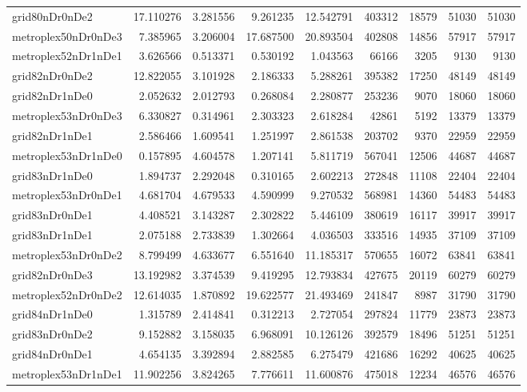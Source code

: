 \begin{longtable}{|l|r|r|r|r|r|r|r|r|}
grid80nDr0nDe2 & 17.110276 & 3.281556 & 9.261235 & 12.542791 & 403312 & 18579 & 51030 & 51030 \\
metroplex50nDr0nDe3 & 7.385965 & 3.206004 & 17.687500 & 20.893504 & 402808 & 14856 & 57917 & 57917 \\
metroplex52nDr1nDe1 & 3.626566 & 0.513371 & 0.530192 & 1.043563 & 66166 & 3205 & 9130 & 9130 \\
grid82nDr0nDe2 & 12.822055 & 3.101928 & 2.186333 & 5.288261 & 395382 & 17250 & 48149 & 48149 \\
grid82nDr1nDe0 & 2.052632 & 2.012793 & 0.268084 & 2.280877 & 253236 & 9070 & 18060 & 18060 \\
metroplex53nDr0nDe3 & 6.330827 & 0.314961 & 2.303323 & 2.618284 & 42861 & 5192 & 13379 & 13379 \\
grid82nDr1nDe1 & 2.586466 & 1.609541 & 1.251997 & 2.861538 & 203702 & 9370 & 22959 & 22959 \\
metroplex53nDr1nDe0 & 0.157895 & 4.604578 & 1.207141 & 5.811719 & 567041 & 12506 & 44687 & 44687 \\
grid83nDr1nDe0 & 1.894737 & 2.292048 & 0.310165 & 2.602213 & 272848 & 11108 & 22404 & 22404 \\
metroplex53nDr0nDe1 & 4.681704 & 4.679533 & 4.590999 & 9.270532 & 568981 & 14360 & 54483 & 54483 \\
grid83nDr0nDe1 & 4.408521 & 3.143287 & 2.302822 & 5.446109 & 380619 & 16117 & 39917 & 39917 \\
grid83nDr1nDe1 & 2.075188 & 2.733839 & 1.302664 & 4.036503 & 333516 & 14935 & 37109 & 37109 \\
metroplex53nDr0nDe2 & 8.799499 & 4.633677 & 6.551640 & 11.185317 & 570655 & 16072 & 63841 & 63841 \\
grid82nDr0nDe3 & 13.192982 & 3.374539 & 9.419295 & 12.793834 & 427675 & 20119 & 60279 & 60279 \\
metroplex52nDr0nDe2 & 12.614035 & 1.870892 & 19.622577 & 21.493469 & 241847 & 8987 & 31790 & 31790 \\
grid84nDr1nDe0 & 1.315789 & 2.414841 & 0.312213 & 2.727054 & 297824 & 11779 & 23873 & 23873 \\
grid83nDr0nDe2 & 9.152882 & 3.158035 & 6.968091 & 10.126126 & 392579 & 18496 & 51251 & 51251 \\
grid84nDr0nDe1 & 4.654135 & 3.392894 & 2.882585 & 6.275479 & 421686 & 16292 & 40625 & 40625 \\
metroplex53nDr1nDe1 & 11.902256 & 3.824265 & 7.776611 & 11.600876 & 475018 & 12234 & 46576 & 46576 \\

\end{longtable}
